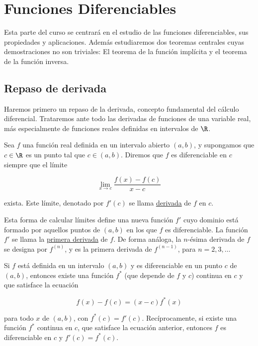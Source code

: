 \section{Funciones Diferenciables}
\addtocounter{sec}{1}

Esta parte del curso se centrará en el estudio de las funciones diferenciables, sus propiedades y aplicaciones. Además estudiaremos dos teoremas centrales cuyas demostraciones no son triviales: El teorema de la función implícita y el teorema de la función inversa.

\subsection{Repaso de derivada}

Haremos primero un repaso de la derivada, concepto fundamental del cálculo diferencial. Trataremos ante todo las derivadas de funciones de una variable real, más especialmente de funciones reales definidas en intervalos de $\R$.

\begin{defn}
    Sea $f$ una función real definida en un intervalo abierto $(a, b)$, y supongamos que $c \in \R$ es un punto tal que $c \in (a, b)$. Diremos que $f$ es diferenciable en $c$ siempre que el límite
    
    \[
    \lim_{x \to c} \frac{f(x) - f(c)}{x-c}
    \]
    
    \noindent exista. Este límite, denotado por $f'(c)$ se llama \ul{derivada} de $f$ en $c$.
\end{defn}

Esta forma de calcular límites define una nueva función $f'$ cuyo dominio está formado por aquellos puntos de $(a, b)$ en los que $f$ es diferenciable. La función $f'$ se llama la \ul{primera derivada} de $f$. De forma análoga, la $n$-ésima derivada de $f$ se designa por $f^{(n)}$, y es la primera derivada de $f^{(n-1)}$, para $n = 2, 3, \dots$

\begin{teo}\label{teo:1.1.1}
    Si $f$ está definida en un intervalo $(a, b)$ y es diferenciable en un punto $c$ de $(a, b)$, entonces existe una función $f^*$ (que depende de $f$ y $c$) continua en $c$ y que satisface la ecuación
    
    \begin{equation}\label{eq:1.1.1}
        f(x) - f(c) = (x-c)f^*(x)
    \end{equation}
    
    \noindent para todo $x$ de $(a, b)$, con $f^*(c) = f'(c)$. Recíprocamente, si existe una función $f^*$ continua en $c$, que satisface la ecuación anterior, entonces $f$ es diferenciable en $c$ y $f'(c) = f^*(c)$.
\end{teo}

